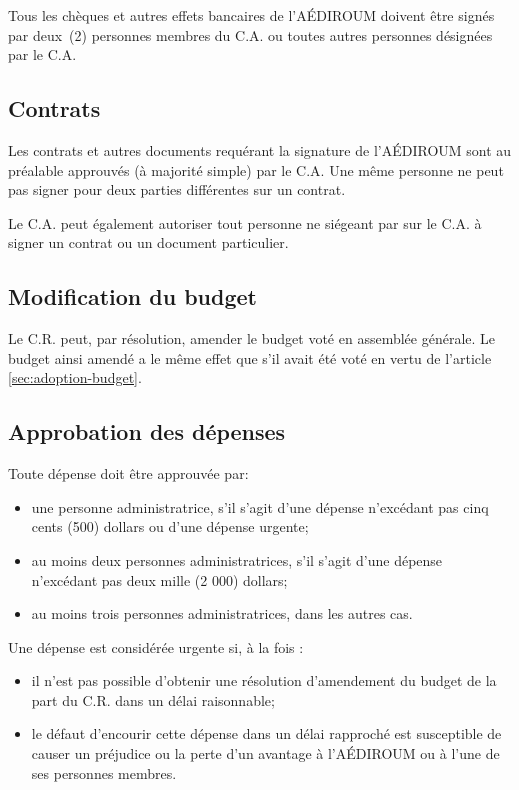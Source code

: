 \documentclass{aediroum}
\newcommand{\article}[1]{article \ref{#1}}
\begin{document}
Tous les chèques et autres effets bancaires de l'AÉDIROUM doivent être signés par deux~(2) personnes membres du C.A. ou toutes autres personnes désignées par le C.A.

\subsection{Contrats}\label{sec:contrats}

Les contrats et autres documents requérant la signature de l'AÉDIROUM sont au préalable approuvés (à majorité simple) par le C.A. Une même personne ne peut pas signer pour deux parties différentes sur un contrat.

Le C.A. peut également autoriser tout personne ne siégeant par sur le C.A. à signer un contrat ou un document particulier.

\subsection{Modification du budget}\label{sec:modification-budget}

Le C.R. peut, par résolution, amender le budget voté en assemblée générale. Le budget ainsi amendé a le même effet que s'il avait été voté en vertu de l'\article{sec:adoption-budget}.

\subsection{Approbation des dépenses}\label{sec:approbation-des-depenses}

Toute dépense doit être approuvée par:
\begin{itemize}
    \item une personne administratrice, s’il s’agit d’une dépense n’excédant pas cinq cents (500)
dollars ou d’une dépense urgente;
    \item au moins deux personnes administratrices, s’il s’agit d’une dépense n’excédant pas
deux mille (2 000) dollars;
	\item au moins trois personnes administratrices, dans les autres cas.
\end{itemize}
Une dépense est considérée urgente si, à la fois :
\begin{itemize}
    \item il n'est pas possible d'obtenir une résolution d'amendement du budget de la part du C.R. dans un délai raisonnable;
    \item le défaut d'encourir cette dépense dans un délai rapproché est susceptible de causer un préjudice ou la perte d'un avantage à l'AÉDIROUM ou à l'une de ses personnes membres.
\end{itemize}
\end{document}
